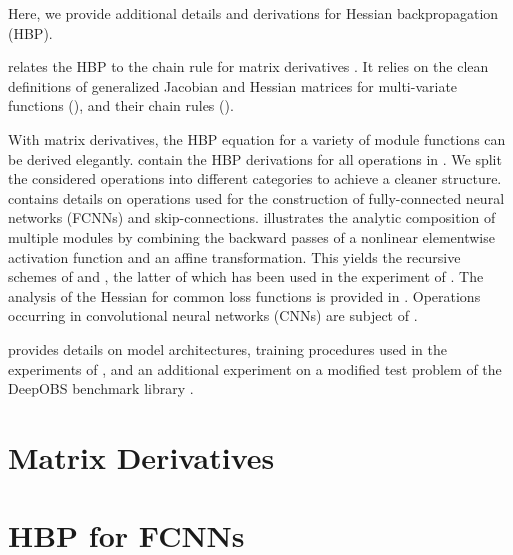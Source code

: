 Here, we provide additional details and derivations for Hessian
backpropagation (HBP).

 relates the HBP
 to the chain rule for matrix derivatives
\citep{magnus1999MatrixDifferentialCalculus}. It relies on the clean definitions
of generalized Jacobian and Hessian matrices for multi-variate functions
(), and their
chain rules ().

With matrix derivatives, the HBP equation for a variety of module functions can
be derived elegantly.
contain the HBP derivations for all operations in
. We split the considered operations into
different categories to achieve a cleaner structure.
 contains details on operations used for the
construction of fully-connected neural networks (FCNNs) and skip-connections.
 illustrates the analytic composition of multiple
modules by combining the backward passes of a nonlinear elementwise activation
function and an affine transformation. This yields the recursive schemes of
\citet{botev2017practical} and \citet{wei2018bdapch}, the latter of which has
been used in the experiment of . The analysis of the
Hessian for common loss functions is provided in .
Operations occurring in convolutional neural networks (CNNs) are subject of
.

 provides details on model architectures, training
procedures used in the experiments of , and an additional
experiment on a modified test problem of the DeepOBS benchmark library
\citep{schneider2019deepobs}.

\section{Matrix Derivatives}\label{hbp::sec:matrixDifferentialCalculus}


\section{HBP for FCNNs}\label{hbp::sec:examples_fcnn}


